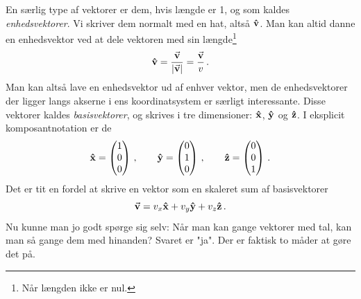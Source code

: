 En særlig type af vektorer er dem, hvis længde er 1, og som kaldes \emph{enhedsvektorer}.
Vi skriver dem normalt med en hat, altså $\vu{v}$. Man kan altid danne en enhedsvektor ved at dele vektoren med sin længde\footnote{Når længden ikke er nul.}
\begin{equation}
    \vu v=\frac{\va v}{\abs{\va v}}=\frac{\va v}{v} \, .
\end{equation}
Man kan altså lave en enhedsvektor ud af enhver vektor, men de enhedsvektorer der ligger langs akserne i ens koordinatsystem er særligt interessante.
Disse vektorer kaldes \emph{basisvektorer}, og skrives i tre dimensioner: $\vu{x}$, $\vu{y}$ og $\vu{z}$. I eksplicit komposantnotation er de
\begin{equation}
    \vu x = \begin{pmatrix}
    1\\0\\0 
    \end{pmatrix} \, , \qquad
    \vu y = \begin{pmatrix}
    0\\1\\0 
    \end{pmatrix} \, , \qquad
    \vu z = \begin{pmatrix}
    0\\0\\1 
    \end{pmatrix} \, .
\end{equation}
Det er tit en fordel at skrive en vektor som en skaleret sum af basisvektorer
\begin{equation}
    \va v = v_x \vu x + v_y \vu y + v_z \vu z \, .
\end{equation}
Nu kunne man jo godt spørge sig selv: Når man kan gange vektorer med tal, kan man så gange dem med hinanden?
Svaret er "ja".
Der er faktisk to måder at gøre det på.

